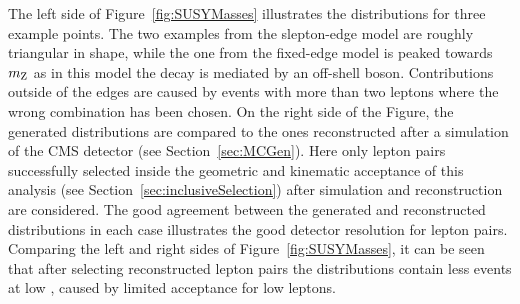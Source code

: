 The left side of Figure~\ref{fig:SUSYMasses} illustrates the \mll distributions for three example points. The two examples from the slepton-edge model are roughly triangular in shape, while the one from the fixed-edge model is peaked towards $m_{\mathrm{Z}}$ as in this model the decay is mediated by an off-shell \Z boson. Contributions outside of the edges are caused by events with more than two leptons where the wrong combination has been chosen. On the right side of the Figure, the generated distributions are compared to the ones reconstructed after a simulation of the CMS detector (see Section~\ref{sec:MCGen}). Here only lepton pairs successfully selected inside the geometric and kinematic acceptance of this analysis (see Section~\ref{sec:inclusiveSelection}) after simulation and reconstruction are considered. The good agreement between the generated and reconstructed distributions in each case illustrates the good detector resolution for lepton pairs. Comparing the left and right sides of Figure~\ref{fig:SUSYMasses}, it can be seen that after selecting reconstructed lepton pairs the distributions contain less events at low \mll, caused by limited acceptance for low \pt leptons. 
